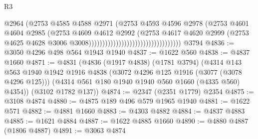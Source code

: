 \begin{lexlean}{R3}
\begin{coremodule}
                                                            @2964
                                                            (@2753
                                                              @4585
                                                              @4588
                                                              @2971
                                                              (@2753
                                                                @4593
                                                                @4596
                                                                @2978
                                                                (@2753
                                                                  @4601
                                                                  @4604
                                                                  @2985
                                                                  (@2753
                                                                    @4609
                                                                    @4612
                                                                    @2992
                                                                    (@2753
                                                                      @4617
                                                                      @4620
                                                                      @2999
                                                                      (@2753
                                                                        @4625
                                                                        @4628
                                                                        @3006
                                                                        @3008))))))))))))))))))))))))))))))))))
    @3794
@4836 := @3050 @4296 @498 @564 @1943 @1940
@4837 := @1622 @560
@4838 := @4837 @1660
@4871 := @4831
    (@4836
      (@1917 @4838)
      (@1781 @3794)
      (@4314
        @143
        @563
        @1940
        @1942
        @1916
        @4838
        (@3072 @4296 @125 @1916 (@3077 (@3078 @4296 @125)))
        (@4314 @561 @180 @1940 @1940 @560 @1660 (@4335 @560) @4354))
      (@3102 @1782 @137))
@4874 := @2347 (@2351 @1779) @2354
@4875 := @3108 @4874
@4880 := @4875 @189 @496 @579 @1965 @1940
@4881 := @1622 @571
@4882 := @4881 @1660
@4883 := @4303 @4882
@4884 := @4837 @4883
@4885 := @1621 @4884
@4887 := @1622 @4885 @1660
@4890 := @4880 @4887 (@1806 @4887)
@4891 := @3063 @4874

\end{coremodule}
\end{lexlean}
